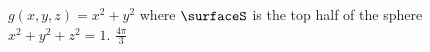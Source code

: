 {$g(x,y,z)=x^2+y^2$ where $\surfaceS$ is the top half of the sphere $x^2+y^2+z^2=1$.
}
{$\frac{4\pi}{3}$}
